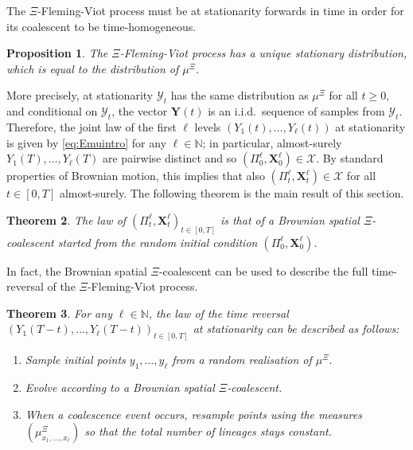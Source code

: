 \documentclass[reqno,draft]{amsart}
\numberwithin{equation}{section}
\theoremstyle{plain}
\newtheorem{theorem}{Theorem}[section]
\newtheorem{proposition}[theorem]{Proposition}
\theoremstyle{remark}
\newcommand{\N}{\mathbb{N}} %
\newcommand{\fpart}{\Pi} %
\begin{document}
The $\Xi$-Fleming-Viot process must be at stationarity forwards in time in order for its coalescent to be time-homogeneous.
\begin{proposition}\label{prop:xifvstationary}
    The $\Xi$-Fleming-Viot process has a unique stationary distribution, which is equal to the distribution of $\mu^\Xi$. %
\end{proposition}
More precisely, at stationarity $\mathcal{Y}_t$ has the same distribution as $\mu^\Xi$ for all $t\ge 0$, and conditional on $\mathcal{Y}_t$, the vector $\boldsymbol Y(t)$ is an i.i.d.\ sequence of samples from $\mathcal{Y}_t$. Therefore, the joint law of the first $\ell$ levels $(Y_1(t), \ldots ,Y_\ell(t))$ at stationarity is given by \cref{eq:Emuintro} for any $\ell\in \N$; in particular, almost-surely $Y_1(T), \ldots ,Y_\ell(T)$ are pairwise distinct and so $(\fpart_0^\ell,\boldsymbol X_0^\ell) \in \mathcal{X}$. By standard properties of Brownian motion, this implies that also $(\fpart_t^\ell,\boldsymbol X_t^\ell) \in \mathcal{X}$ for all $t\in [0,T]$ almost-surely.
The following theorem is the main result of this section.


\begin{theorem}\label{thm:xigenealogiesintro}
    The law of $(\fpart^\ell_t,\boldsymbol X^\ell_t)_{t\in[0,T]}$ is that of a Brownian spatial $\Xi$-coalescent started from the random initial condition $(\fpart_0^\ell,\boldsymbol X_0^\ell)$.
\end{theorem}

In fact, the Brownian spatial $\Xi$-coalescent can be used to describe the full time-reversal of the $\Xi$-Fleming-Viot process.

\begin{theorem}\label{thm:timereversalintro}
    For any $\ell\in \N$, the law of the time reversal $(Y_1(T-t), \ldots ,Y_\ell(T-t))_{t \in[0,T]}$ at stationarity can be described as follows:
    \begin{enumerate}
        \item Sample initial points $y_1, \ldots ,y_\ell$ from a random realisation of $\mu^\Xi$.
        \item Evolve according to a Brownian spatial $\Xi$-coalescent.
        \item When a coalescence event occurs, resample points using the measures $(\mu^\Xi_{x_1, \ldots ,x_\ell})$ so that the total number of lineages stays constant.
    \end{enumerate}
\end{theorem}
\end{document}
